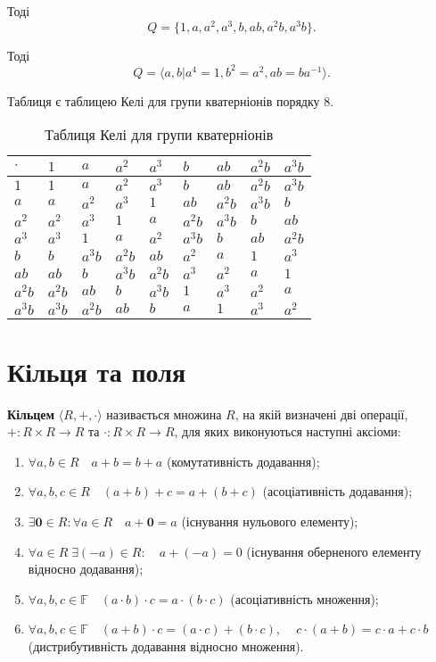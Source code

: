   Тоді
 \[
 Q = \{ 1,a,a^2,a^3, b, ab,a^2b,a^3b\}.
 \]

Тоді
\[
Q = \langle a,b | a^4 = 1, b^2 = a^2, ab=ba^{-1} \rangle.
\]

Таблиця  є таблицею Келі для групи кватерніонів порядку 8.


\begin{table}[h!]
 \centering
\normalsize 
\begin{tabular}{|l|l|l|l|l|l|l|l|l|}
\hline
$\cdot$ & $1$ & $a$ & $a^2$ & $a^3$ & $b$ & $ab$ & $a^2b$ & $a^3b$ \\ \hline
$1$ & $1$ & $a$ & $a^2$ & $a^3$ & $b$ & $ab$ & $a^2b$ & $a^3b$ \\ \hline
$a$ & $a$ & $a^2$ & $a^3$ & $1$ & $ab$ & $a^2b$ & $a^3b$ & $b$ \\ \hline
$a^2$ & $a^2$ & $a^3$ & $1$ & $a$ & $a^2b$ & $a^3b$ & $b$ & $ab$ \\ \hline
$a^3$ & $a^3$ & $1$ & $a$ & $a^2$ & $a^3b$ & $b$ & $ab$ & $a^2b$ \\ \hline
$b$ & $b$ & $a^3b$ & $a^2b$ & $ab$ & $a^2$ & $a$ & $1$ & $a^3$ \\ \hline
$ab$ & $ab$ & $b$ & $a^3b$ & $a^2b$ & $a^3$ & $a^2$ & $a$ & $1$ \\ \hline
$a^2b$ & $a^2b$ & $ab$ & $b$ & $a^3b$ & $1$ & $a^3$ & $a^2$ & $a$ \\ \hline
$a^3b$ & $a^3b$ & $a^2b$ & $ab$ & $b$ & $a$ & $1$ & $a^3$ & $a^2$ \\ \hline
\end{tabular}
\caption{Таблиця Келі для групи кватерніонів}
\label{tabq}

\end{table}


\section{Кільця та поля}\label{section.1.4}


\textbf{Кільцем} $\langle R, +, \cdot \rangle$ називається множина $R$, на якій визначені дві операції, $+: R \times R \to R$ та $\cdot: R \times R \to R$, для яких виконуються наступні аксіоми:
\begin{enumerate}[noitemsep,partopsep=0pt,topsep=0pt,parsep=0pt]
\item $\forall a,b \in R \quad a+b=b+a$ (комутативність додавання);
\item $\forall a,b,c \in R \quad (a+b)+c=a+(b+c)$ (асоціативність додавання);
\item $\exists \mathbf{0} \in R: \forall a \in R \quad a+\mathbf{0}=a$ (існування нульового елементу);
\item $\forall a \in R \; \exists (-a) \in R: \quad a+(-a)=0$ (існування оберненого елементу відносно додавання);
\item $\forall a,b,c \in \mathbb{F} \quad (a \cdot b) \cdot c=a \cdot (b \cdot c)$ (асоціативність множення);
\item $\forall a,b,c \in \mathbb{F} \quad (a+b) \cdot c=(a \cdot c)+(b \cdot c)$, $\quad   c \cdot (a+b)=c \cdot a+c \cdot b$ (дистрибутивність додавання відносно множення).
\end{enumerate} 




